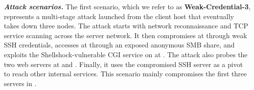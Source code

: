 \documentclass[runningheads,10pt]{llncs}
\begin{document}

\noindent\textit{\textbf{Attack scenarios.}} The first scenario, which we refer to as \textbf{Weak-Credential-3}, represents a multi-stage attack launched from the client host  that eventually takes down three nodes. The attack starts with network reconnaissance and TCP service scanning across the server network. It then compromises  at  through weak SSH credentials, accesses  at  through an exposed anonymous SMB share, and exploits the Shellshock-vulnerable CGI service on  at . The attack also probes the two web servers at  and . Finally, it uses the compromised SSH server as a pivot to reach other internal services. This scenario mainly compromises the first three servers in .
\end{document}
